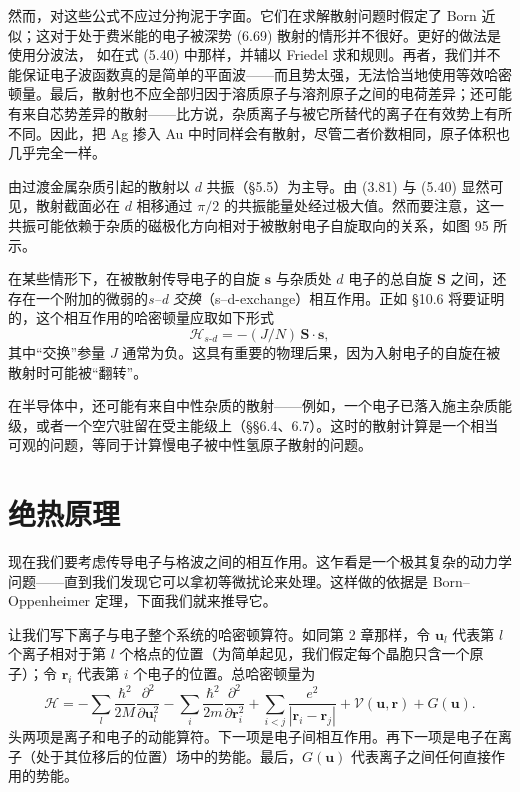 然而，对这些公式不应过分拘泥于字面。它们在求解散射问题时假定了 Born 近似；这对于处于费米能的电子被深势 (6.69) 散射的情形并不很好。更好的做法是使用分波法，
如在式 (5.40) 中那样，并辅以 Friedel 求和规则。再者，我们并不能保证电子波函数真的是简单的平面波——而且势太强，无法恰当地使用等效哈密顿量。最后，散射也不应全部归因于溶质原子与溶剂原子之间的电荷差异；还可能有来自芯势差异的散射——比方说，杂质离子与被它所替代的离子在有效势上有所不同。因此，把 Ag 掺入 Au 中时同样会有散射，尽管二者价数相同，原子体积也几乎完全一样。

由过渡金属杂质引起的散射以 $d$ 共振（§5.5）为主导。由 (3.81) 与 (5.40) 显然可见，散射截面必在 $d$ 相移通过 $\pi/2$ 的共振能量处经过极大值。然而要注意，这一共振可能依赖于杂质的磁极化方向相对于被散射电子自旋取向的关系，如图 95 所示。

在某些情形下，在被散射传导电子的自旋 $\mathbf{s}$ 与杂质处 $d$ 电子的总自旋 $\mathbf{S}$ 之间，还存在一个附加的微弱的\emph{s--d 交换}（s--d-exchange）相互作用。正如 §10.6 将要证明的，这个相互作用的哈密顿量应取如下形式
\begin{equation*}
\mathcal{H}_{s\text{-}d} = -(J/N)\,\mathbf{S}\cdot\mathbf{s}, \tag{6.71}
\end{equation*}
其中“交换”参量 $J$ 通常为负。这具有重要的物理后果，因为入射电子的自旋在被散射时可能被“翻转”。

在半导体中，还可能有来自中性杂质的散射——例如，一个电子已落入施主杂质能级，或者一个空穴驻留在受主能级上（§§6.4、6.7）。这时的散射计算是一个相当可观的问题，等同于计算慢电子被中性氢原子散射的问题。

\section{绝热原理}

现在我们要考虑传导电子与格波之间的相互作用。这乍看是一个极其复杂的动力学问题——直到我们发现它可以拿初等微扰论来处理。这样做的依据是 Born--Oppenheimer 定理，下面我们就来推导它。

让我们写下离子与电子整个系统的哈密顿算符。如同第 2 章那样，令 $\mathbf{u}_l$ 代表第 $l$ 个离子相对于第 $l$ 个格点的位置（为简单起见，我们假定每个晶胞只含一个原子）；令 $\mathbf{r}_i$ 代表第 $i$ 个电子的位置。总哈密顿量为
\begin{equation*}
\mathcal{H} = -\sum_{l}\frac{\hbar^{2}}{2M}\frac{\partial^{2}}{\partial\mathbf{u}_{l}^{2}} - \sum_{i}\frac{\hbar^{2}}{2m}\frac{\partial^{2}}{\partial\mathbf{r}_{i}^{2}} + \sum_{i<j}\frac{e^{2}}{|\mathbf{r}_{i}-\mathbf{r}_{j}|} + \mathcal{V}(\mathbf{u},\mathbf{r}) + G(\mathbf{u}). \tag{6.72}
\end{equation*}
头两项是离子和电子的动能算符。下一项是电子间相互作用。再下一项是电子在离子（处于其位移后的位置）场中的势能。最后，$G(\mathbf{u})$ 代表离子之间任何直接作用的势能。

